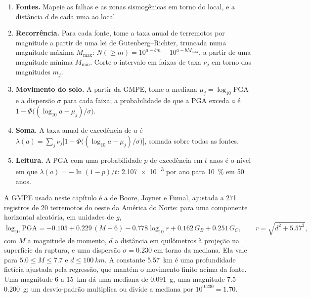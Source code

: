 \begin{method}\label{met:b2:geological-hazards:psha}
\begin{enumerate}
  \item \textbf{Fontes.} Mapeie as falhas e as zonas sismogênicas em torno do local, e a distância $d$ de
        cada uma ao local.
  \item \textbf{Recorrência.} Para cada fonte, tome a taxa anual de terremotos por magnitude
        a partir de uma lei de Gutenberg--Richter, truncada numa magnitude máxima $M_{\max}$:
        $N(\geq m) = 10^{a - bm} - 10^{a - bM_{\max}}$, a partir de uma magnitude mínima $M_{\min}$.
        Corte o intervalo em faixas de taxa $\nu_j$ em torno das magnitudes $m_j$.
  \item \textbf{Movimento do solo.} A partir da GMPE, tome a mediana $\mu_j = \log_{10}\mathrm{PGA}$ e
        a dispersão $\sigma$ para cada faixa; a probabilidade de que a PGA exceda $a$ é
        $1 - \Phi\bigl((\log_{10} a - \mu_j)/\sigma\bigr)$.
  \item \textbf{Soma.} A taxa anual de excedência de $a$ é $\lambda(a) = \sum_j \nu_j
        \bigl[1 - \Phi\bigl((\log_{10} a - \mu_j)/\sigma\bigr)\bigr]$, somada sobre todas as fontes.
  \item \textbf{Leitura.} A PGA com uma probabilidade $p$ de excedência em $t$ anos é o nível em que
        $\lambda(a) = -\ln(1 - p)/t$: \num{2.107e-3} por ano para \qty{10}{\percent} em 50 anos.
\end{enumerate}
\end{method}

A GMPE usada neste capítulo é a de Boore, Joyner e Fumal, ajustada a 271 registros de 20
terremotos do oeste da América do Norte: para uma componente horizontal aleatória, em unidades de $g$,
\begin{equation}
\log_{10}\mathrm{PGA} = -0.105 + 0.229\,(M - 6) - 0.778\log_{10} r + 0.162\,G_B + 0.251\,G_C,
\qquad r = \sqrt{d^2 + 5.57^2},
\label{eq:b2:geological-hazards:gmpe}
\end{equation}
com $M$ a magnitude de momento, $d$ a distância em quilômetros à projeção na superfície da
ruptura, e uma dispersão $\sigma = 0.230$ em torno da mediana. Ela vale para $5.0 \leq M \leq 7.7$ e $d
\leq \qty{100}{km}$. A constante \qty{5.57}{km} é uma profundidade fictícia ajustada pela regressão,
que mantém o movimento finito acima da fonte. Uma magnitude 6 a \qty{15}{km} dá uma mediana de
\qty{0.091}{g}, uma magnitude 7.5 \qty{0.200}{g}; um desvio-padrão multiplica ou divide a
mediana por $10^{0.230} = 1.70$.

